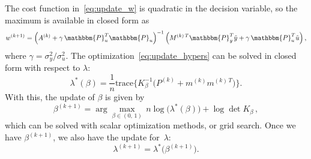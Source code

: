 \documentclass[10pt]{article}
\renewcommand{\P}{\mathbbm{P}}
\newcommand{\trace}{\mathrm{trace}}
\begin{document}
The cost function in~\eqref{eq:update_w} is quadratic in the decision variable,
so the maximum is available in closed form as
\begin{equation*}
  w^{(k+1)} ={\left(A^{(k)}+\gamma\,
    \P_u^T\P_u  \right)}^{-1}  \left(
    M^{(k)\,T}\P_y^T\tilde y +
  \gamma\, \P_u^T\tilde u \right),
\end{equation*}
where $\gamma = \sigma_y^2/\sigma_u^2$.
The optimization~\eqref{eq:update_hypers} can be solved in closed form with
respect to $\lambda$:
\begin{equation}
  \lambda^*(\beta) = \frac{1}{n}\trace\Big\{K_\beta^{-1}
  \big(P^{(k)}+m^{(k)}m^{(k)\,T}\big)\Big\}.
\end{equation}
With this, the update of $\beta$ is given by
\begin{equation}
  \beta^{(k+1)} =\arg\max_{\beta\in(0,\,1)}\, n\log\big( \lambda^*(\beta) \big) +
  \log\det K_\beta\, ,
\end{equation}
which can be solved with scalar optimization methods, or grid search. Once
we have $\beta^{(k+1)}$, we also have the update for~$\lambda$:
\begin{equation}
  \lambda^{(k+1)} = \lambda^*\big(\beta^{(k+1)}\big).
\end{equation}
\end{document}
